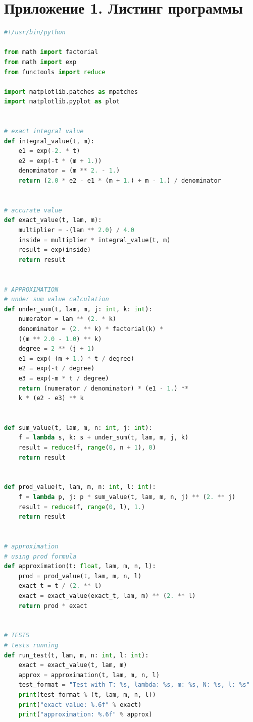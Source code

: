 \documentclass [12pt]{report}
\begin{document}
\chapter*{Приложение 1. Листинг программы}

\begin{lstlisting}[language=Python]
#!/usr/bin/python

from math import factorial
from math import exp
from functools import reduce

import matplotlib.patches as mpatches
import matplotlib.pyplot as plot


# exact integral value
def integral_value(t, m):
    e1 = exp(-2. * t)
    e2 = exp(-t * (m + 1.))
    denominator = (m ** 2. - 1.)
    return (2.0 * e2 - e1 * (m + 1.) + m - 1.) / denominator


# accurate value
def exact_value(t, lam, m):
    multiplier = -(lam ** 2.0) / 4.0
    inside = multiplier * integral_value(t, m)
    result = exp(inside)
    return result


# APPROXIMATION
# under sum value calculation
def under_sum(t, lam, m, j: int, k: int):
    numerator = lam ** (2. * k)
    denominator = (2. ** k) * factorial(k) *
    ((m ** 2.0 - 1.0) ** k)
    degree = 2 ** (j + 1)
    e1 = exp(-(m + 1.) * t / degree)
    e2 = exp(-t / degree)
    e3 = exp(-m * t / degree)
    return (numerator / denominator) * (e1 - 1.) **
    k * (e2 - e3) ** k


def sum_value(t, lam, m, n: int, j: int):
    f = lambda s, k: s + under_sum(t, lam, m, j, k)
    result = reduce(f, range(0, n + 1), 0)
    return result


def prod_value(t, lam, m, n: int, l: int):
    f = lambda p, j: p * sum_value(t, lam, m, n, j) ** (2. ** j)
    result = reduce(f, range(0, l), 1.)
    return result


# approximation
# using prod formula
def approximation(t: float, lam, m, n, l):
    prod = prod_value(t, lam, m, n, l)
    exact_t = t / (2. ** l)
    exact = exact_value(exact_t, lam, m) ** (2. ** l)
    return prod * exact


# TESTS
# tests running
def run_test(t, lam, m, n: int, l: int):
    exact = exact_value(t, lam, m)
    approx = approximation(t, lam, m, n, l)
    test_format = "Test with T: %s, lambda: %s, m: %s, N: %s, l: %s"
    print(test_format % (t, lam, m, n, l))
    print("exact value: %.6f" % exact)
    print("approximation: %.6f" % approx)



\end{lstlisting}
\end{document}
